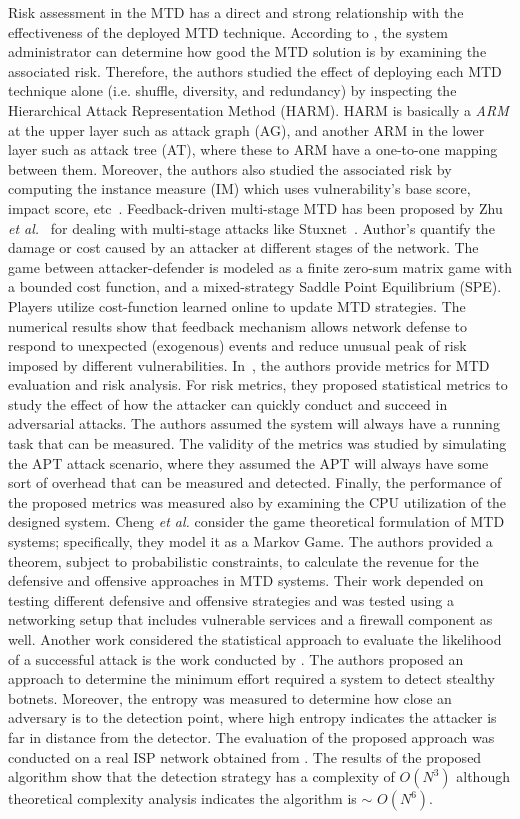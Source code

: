 Risk assessment in the MTD has a direct and strong {relationship} with the {effectiveness} of the deployed MTD technique. According to , the system administrator can determine how good the MTD solution is by examining the associated risk. Therefore, the authors  studied the effect of deploying each MTD technique alone (i.e. shuffle, diversity, and redundancy) by inspecting the Hierarchical Attack Representation Method (HARM). {HARM} is basically a \textit{ARM} at the upper layer such as attack graph (AG), and another ARM in the lower layer such as attack tree (AT), where these to ARM have a one-to-one mapping between them. Moreover, the authors also studied the associated risk by computing the {instance measure} (IM) which uses vulnerability's {base score}, {impact score}, etc~.
Feedback-driven multi-stage MTD has been proposed by Zhu \textit{et al.}~ for dealing with multi-stage attacks like Stuxnet~. Author's quantify the damage or cost caused by an attacker at different stages of the network. The game between attacker-defender is modeled as a {finite zero-sum} matrix game with a bounded {cost function}, and a {mixed-strategy} {Saddle Point Equilibrium} (SPE). Players utilize cost-function learned online to update MTD strategies. The numerical results show that {feedback mechanism} allows network defense to respond to unexpected (exogenous) events and reduce unusual peak of {risk} imposed by different vulnerabilities.
In~, the authors provide {metrics} for MTD evaluation and risk analysis. For risk metrics, they proposed statistical metrics to study the effect of how the attacker can quickly conduct and succeed in adversarial attacks. The authors assumed the system will always have a running task that can be measured. The validity of the metrics was studied by simulating the APT attack scenario, where they assumed the APT will always have some sort of overhead that can be measured and detected. Finally, the {performance} of the proposed metrics was measured also by examining the {CPU utilization} of the designed system.
Cheng \textit{et al.}  consider the game theoretical formulation of MTD systems; specifically, they model it as a {Markov Game}. The authors provided a theorem, subject to probabilistic constraints, to calculate the revenue for the defensive and offensive approaches in MTD systems. Their work depended on testing different defensive and offensive strategies and was tested using a networking setup that includes vulnerable services and a {firewall} component as well.
Another work considered the {statistical approach} to evaluate the likelihood of a successful attack is the work conducted by . The authors proposed an approach to determine the minimum effort required a system to detect stealthy botnets. Moreover, the {entropy} was measured to determine how close an adversary is to the detection point, where {high entropy} indicates the {attacker} is far in {distance} from the detector. The evaluation of the proposed approach was conducted on a real ISP network obtained from . The results of the proposed algorithm show that the detection strategy has a {complexity} of $O(N^3)$ although theoretical complexity analysis indicates the algorithm is $\sim$ $O(N^6)$. 
